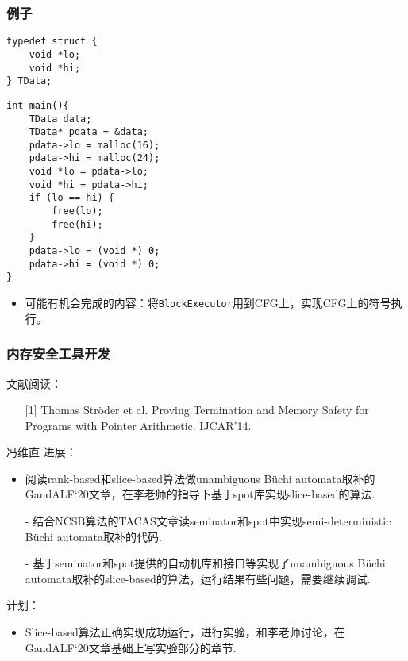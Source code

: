 \documentclass[aspectratio=1610, 13pt]{beamer}
\newcommand{\buchi}{B\"uchi }
\begin{document}
\begin{frame}[fragile]\frametitle{例子}
\begin{multicols}{2}
\begin{lstlisting}
typedef struct {
    void *lo;
    void *hi;
} TData;
\end{lstlisting}
\begin{lstlisting}
int main(){
    TData data;
    TData* pdata = &data;
    pdata->lo = malloc(16);
    pdata->hi = malloc(24);
    void *lo = pdata->lo;
    void *hi = pdata->hi;
    if (lo == hi) {
        free(lo);
        free(hi);
    }
    pdata->lo = (void *) 0;
    pdata->hi = (void *) 0;
}
\end{lstlisting}

\begin{itemize}
\item 可能有机会完成的内容：将\texttt{BlockExecutor}用到CFG上，实现CFG上的符号执行。
\end{itemize}
\end{multicols}

\end{frame}

\begin{frame}\frametitle{内存安全工具开发}
文献阅读：
\begin{itemize}

\item [{[1]}] Thomas Ströder et al. Proving Termination and Memory Safety for Programs with Pointer Arithmetic. IJCAR'14.
\end{itemize}
\end{frame}
\begin{frame}{冯维直}
进展：
    \begin{itemize}
        \item 阅读rank-based和slice-based算法做unambiguous \buchi automata取补的GandALF‘20文章，在李老师的指导下基于spot库实现slice-based的算法.
        \item [-] 结合NCSB算法的TACAS文章读seminator和spot中实现semi-deterministic \buchi automata取补的代码.
        \item [-] 基于seminator和spot提供的自动机库和接口等实现了unambiguous \buchi automata取补的slice-based的算法，运行结果有些问题，需要继续调试.
\end{itemize}    
计划：
    
    \begin{itemize}
        \item Slice-based算法正确实现成功运行，进行实验，和李老师讨论，在GandALF‘20文章基础上写实验部分的章节.
\end{itemize}    
\end{frame}
\end{document}
